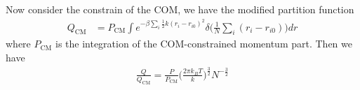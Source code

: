 \documentclass[aps,pre,a4paper,showkeys,fleqn]{revtex4}
\newcommand{\com}[0]{{\textrm{CM}}}
\begin{document}
Now consider the constrain of the COM, we have the modified partition function
\begin{align*}
  Q_\com
  &= 
    {P_\com}
    \int e^{-\beta\sum_i \frac 12k(r_i - r_{i0})^2} \delta\big(\frac1N\sum_i (r_i -  r_{i0})\big) dr 
\end{align*}
where $P_\com$ is the integration of the COM-constrained momentum part.
Then we have
\begin{align}
  \frac{Q}{Q_\com} = \frac{P}{P_\com}\Big( \frac{2\pi k_BT}k  \Big)^{\frac32} N^{-\frac32}
\end{align}
\end{document}
